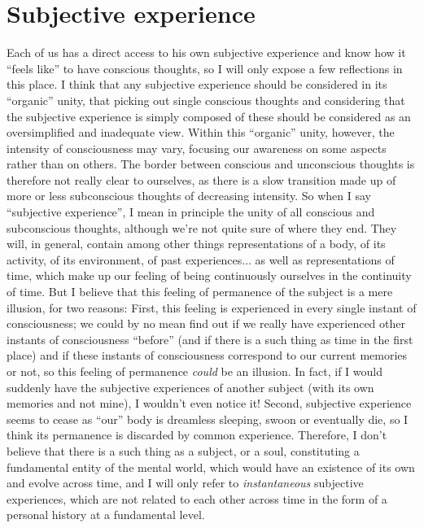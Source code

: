 \section{Subjective experience}

Each of us has a direct access to his own subjective experience and know how it ``feels like'' to have conscious thoughts, so I will only expose a few reflections in this place. I think that any subjective experience should be considered in its ``organic'' unity, that picking out single conscious thoughts and considering that the subjective experience is simply composed of these should be considered as an oversimplified and inadequate view. Within this ``organic'' unity, however, the intensity of consciousness may vary, focusing our awareness on some aspects rather than on others. The border between conscious and unconscious thoughts is therefore not really clear to ourselves, as there is a slow transition made up of more or less subconscious thoughts of decreasing intensity. So when I say ``subjective experience'', I mean in principle the unity of all conscious and subconscious thoughts, although we're not quite sure of where they end. They will, in general, contain among other things representations of a body, of its activity, of its environment, of past experiences... as well as representations of time, which make up our feeling of being continuously ourselves in the continuity of time. But I believe that this feeling of permanence of the subject is a mere illusion, for two reasons: First, this feeling is experienced in every single instant of consciousness; we could by no mean find out if we really have experienced other instants of consciousness ``before'' (and if there is a such thing as time in the first place) and if these instants of consciousness correspond to our current memories or not, so this feeling of permanence \textit{could} be an illusion. In fact, if I would suddenly have the subjective experiences of another subject (with its own memories and not mine), I wouldn't even notice it! Second, subjective experience seems to cease as ``our'' body is dreamless sleeping, swoon or eventually die, so I think its permanence is discarded by common experience. Therefore, I don't believe that there is a such thing as a subject, or a soul, constituting a fundamental entity of the mental world, which would have an existence of its own and evolve across time, and I will only refer to \textit{instantaneous} subjective experiences, which are not related to each other across time in the form of a personal history at a fundamental level.

